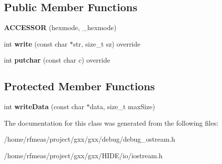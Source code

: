 \subsection*{Public Member Functions}
\begin{DoxyCompactItemize}
\item 
{\bfseries A\+C\+C\+E\+S\+S\+OR} (hexmode, \+\_\+hexmode)\hypertarget{classgxx_1_1debug__ostream_a26f05c9a368bfa5fbfaf429793f1b852}{}\label{classgxx_1_1debug__ostream_a26f05c9a368bfa5fbfaf429793f1b852}

\item 
int {\bfseries write} (const char $\ast$str, size\+\_\+t sz) override\hypertarget{classgxx_1_1debug__ostream_af320da6e96d352b36e69cdf9ad5a066c}{}\label{classgxx_1_1debug__ostream_af320da6e96d352b36e69cdf9ad5a066c}

\item 
int {\bfseries putchar} (const char c) override\hypertarget{classgxx_1_1debug__ostream_abc694d8fbedd07135143cdd068aae343}{}\label{classgxx_1_1debug__ostream_abc694d8fbedd07135143cdd068aae343}

\end{DoxyCompactItemize}
\subsection*{Protected Member Functions}
\begin{DoxyCompactItemize}
\item 
int {\bfseries write\+Data} (const char $\ast$data, size\+\_\+t max\+Size)\hypertarget{classgxx_1_1debug__ostream_ab0d598e63b09f75a583a9212394ade79}{}\label{classgxx_1_1debug__ostream_ab0d598e63b09f75a583a9212394ade79}

\end{DoxyCompactItemize}


The documentation for this class was generated from the following files\+:\begin{DoxyCompactItemize}
\item 
/home/rfmeas/project/gxx/gxx/debug/debug\+\_\+ostream.\+h\item 
/home/rfmeas/project/gxx/gxx/\+H\+I\+D\+E/io/iostream.\+h\end{DoxyCompactItemize}
